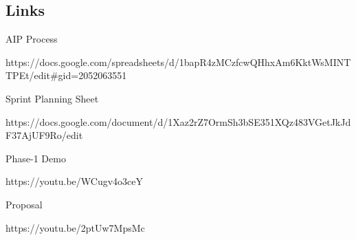 \subsection*{Links}

A\+IP Process 
\begin{DoxyCode}
https://docs.google.com/spreadsheets/d/1bapR4zMCzfcwQHhxAm6KktWsMINTTPEt/edit#gid=2052063551
\end{DoxyCode}


Sprint Planning Sheet 
\begin{DoxyCode}
https://docs.google.com/document/d/1Xaz2rZ7OrmSh3bSE351XQz483VGetJkJdF37AjUF9Ro/edit
\end{DoxyCode}


Phase-\/1 Demo 
\begin{DoxyCode}
https://youtu.be/WCugv4o3ceY
\end{DoxyCode}


Proposal 
\begin{DoxyCode}
https://youtu.be/2ptUw7MpsMc
\end{DoxyCode}
 